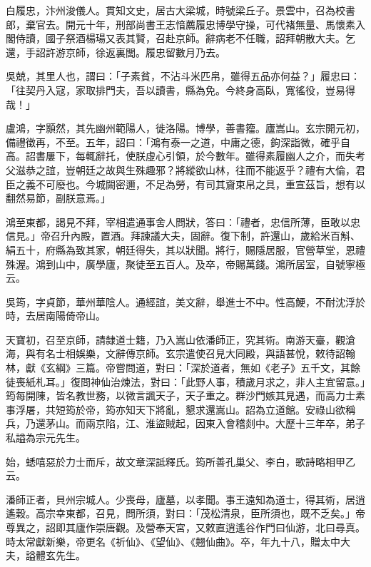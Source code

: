 \begin{pinyinscope}
 白履忠，汴州浚儀人。貫知文史，居古大梁城，時號梁丘子。景雲中，召為校書郎，棄官去。開元十年，刑部尚書王志愔薦履忠博學守操，可代褚無量、馬懷素入閣侍讀，國子祭酒楊瑒又表其賢，召赴京師。辭病老不任職，詔拜朝散大夫。乞還，手詔許游京師，徐返裏閭。履忠留數月乃去。



 吳兢，其里人也，謂曰：「子素貧，不沾斗米匹帛，雖得五品亦何益？」履忠曰：「往契丹入寇，家取排門夫，吾以讀書，縣為免。今終身高臥，寬徭役，豈易得哉！」



 盧鴻，字顥然，其先幽州範陽人，徙洛陽。博學，善書籀。廬嵩山。玄宗開元初，備禮徵再，不至。五年，詔曰：「鴻有泰一之道，中庸之德，鉤深詣微，確乎自高。詔書屢下，每輒辭托，使朕虛心引領，於今數年。雖得素履幽人之介，而失考父滋恭之誼，豈朝廷之故與生殊趣邪？將縱欲山林，往而不能返乎？禮有大倫，君臣之義不可廢也。今城闕密邇，不足為勞，有司其齎束帛之具，重宣茲旨，想有以翻然易節，副朕意焉。」



 鴻至東都，謁見不拜，宰相遣通事舍人問狀，答曰：「禮者，忠信所薄，臣敢以忠信見。」帝召升內殿，置酒。拜諫議大夫，固辭。復下制，許還山，歲給米百斛、絹五十，府縣為致其家，朝廷得失，其以狀聞。將行，賜隱居服，官營草堂，恩禮殊渥。鴻到山中，廣學廬，聚徒至五百人。及卒，帝賜萬錢。鴻所居室，自號寧極云。



 吳筠，字貞節，華州華陰人。通經誼，美文辭，舉進士不中。性高鯁，不耐沈浮於時，去居南陽倚帝山。



 天寶初，召至京師，請隸道士籍，乃入嵩山依潘師正，究其術。南游天臺，觀滄海，與有名士相娛樂，文辭傳京師。玄宗遣使召見大同殿，與語甚悅，敕待詔翰林，獻《玄綱》三篇。帝嘗問道，對曰：「深於道者，無如《老子》五千文，其餘徒喪紙札耳。」復問神仙治煉法，對曰：「此野人事，積歲月求之，非人主宜留意。」筠每開陳，皆名教世務，以微言諷天子，天子重之。群沙門嫉其見遇，而高力士素事浮屠，共短筠於帝，筠亦知天下將亂，懇求還嵩山。詔為立道館。安祿山欲稱兵，乃還茅山。而兩京陷，江、淮盜賊起，因東入會稽剡中。大歷十三年卒，弟子私謚為宗元先生。



 始，蟋嘻惡於力士而斥，故文章深詆釋氏。筠所善孔巢父、李白，歌詩略相甲乙云。



 潘師正者，貝州宗城人。少喪母，廬墓，以孝聞。事王遠知為道士，得其術，居逍遙穀。高宗幸東都，召見，問所須，對曰：「茂松清泉，臣所須也，既不乏矣。」帝尊異之，詔即其廬作崇唐觀。及營奉天宮，又敕直逍遙谷作門曰仙游，北曰尋真。時太常獻新樂，帝更名《祈仙》、《望仙》、《翹仙曲》。卒，年九十八，贈太中大夫，謚體玄先生。




\end{pinyinscope}
